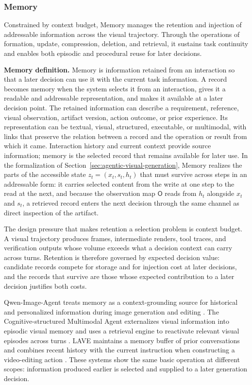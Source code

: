 \subsubsection{Memory}

\begin{keytakeaway}[Memory]
Constrained by context budget, Memory manages the retention and injection of addressable information across the visual trajectory. Through the operations of formation, update, compression, deletion, and retrieval, it sustains task continuity and enables both episodic and procedural reuse for later decisions.
\end{keytakeaway}


\textbf{Memory definition.} Memory is information retained from an interaction so that a later decision can use it with the current task information. A record becomes memory when the system selects it from an interaction, gives it a readable and addressable representation, and makes it available at a later decision point. The retained information can describe a requirement, reference, visual observation, artifact version, action outcome, or prior experience. Its representation can be textual, visual, structured, executable, or multimodal, with links that preserve the relation between a record and the operation or result from which it came. Interaction history and current context provide source information; memory is the selected record that remains available for later use. In the formalization of Section~\ref{sec:agentic-visual-generation}, Memory realizes the parts of the accessible state $z_t=(x_t,s_t,h_t)$ that must survive across steps in an addressable form: it carries selected content from the write at one step to the read at the next, and because the observation map $\mathsf{O}$ reads from $h_t$ alongside $x_t$ and $s_t$, a retrieved record enters the next decision through the same channel as direct inspection of the artifact.

The design pressure that makes retention a selection problem is context budget. A visual trajectory produces frames, intermediate renders, tool traces, and verification outputs whose volume exceeds what a decision context can carry across turns. Retention is therefore governed by expected decision value: candidate records compete for storage and for injection cost at later decisions, and the records that survive are those whose expected contribution to a later decision justifies both costs.

Qwen-Image-Agent treats memory as a context-grounding source for historical and personalized information during image generation and editing \cite{avg260626907}. The Cognitive-structured Multimodal Agent externalizes visual information into episodic visual memory and uses a retrieval engine to reactivate relevant visual episodes across turns \cite{avg260708497}. LAVE maintains a memory buffer of prior conversations and combines recent history with the current instruction when constructing a video-editing action \cite{wang2024lave}. These systems show the same basic operation at different scopes: information produced earlier is selected and supplied to a later generation decision.

